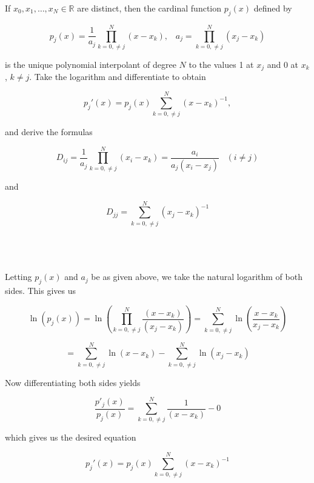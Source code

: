 If $x_0,x_1,\ldots,x_N\in\mathbb{R}$ are distinct, then the cardinal function $p_j(x)$ defined by

$$p_j(x)=\frac{1}{a_j}\prod_{k=0,\neq j}^N(x-x_k),\;\;\;a_j=\prod_{k=0,\neq j}^N(x_j-x_k)$$

is the unique polynomial interpolant of degree $N$ to the values 1 at $x_j$ and 0 at $x_k$, $k\neq j$.
Take the logarithm and differentiate to obtain

$$p_j'(x)=p_j(x)\sum_{k=0,\neq j}^N(x-x_k)^{-1},$$

and derive the formulas

$$D_{ij}=\frac{1}{a_j}\prod_{k=0,\neq j}^N(x_i-x_k)=\frac{a_i}{a_j(x_i-x_j)}\;\;\;(i\neq j)$$

and

$$D_{jj}=\sum_{k=0,\neq j}^N(x_j-x_k)^{-1}$$\\\\

\begin{solution}\renewcommand{\qedsymbol}{}\ \\
    Letting $p_j(x)$ and $a_j$ be as given above, we take the natural logarithm of both sides. This
    gives us

    $$\ln(p_j(x))=\ln(\prod_{k=0,\neq j}^N\frac{(x-x_k)}{(x_j-x_k)})=
    \sum_{k=0,\neq j}^N\ln(\frac{x-x_k}{x_j-x_k})$$

    $$=\sum_{k=0,\neq j}^N\ln(x-x_k)-\sum_{k=0,\neq j}^N\ln(x_j-x_k)$$

    Now differentiating both sides yields

    $$\frac{p'_j(x)}{p_j(x)}=\sum_{k=0,\neq j}^N\frac{1}{(x-x_k)}-0$$

    which gives us the desired equation

    $$p_j'(x)=p_j(x)\sum_{k=0,\neq j}^N(x-x_k)^{-1}$$

\end{solution}   